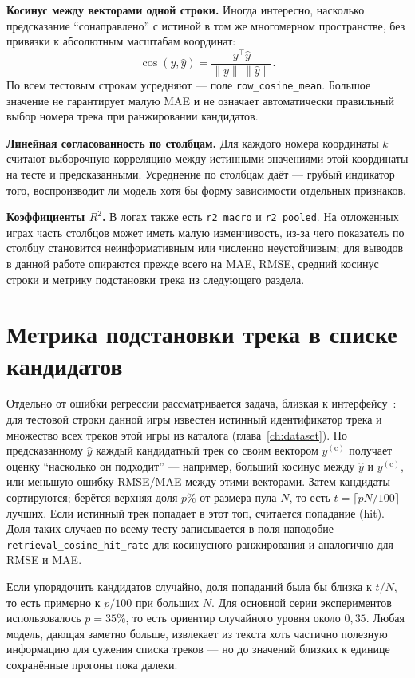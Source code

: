 \textbf{Косинус между векторами одной строки.} Иногда интересно, насколько предсказание ``сонаправлено'' с истиной в том же многомерном пространстве, без привязки к абсолютным масштабам координат:
\[
\cos(y, \hat y) = \frac{y^\top \hat y}{\|y\|\,\|\hat y\|}.
\]
По всем тестовым строкам усредняют --- поле \texttt{row\_cosine\_mean}. Большое значение не гарантирует малую MAE и не означает автоматически правильный выбор номера трека при ранжировании кандидатов.

\textbf{Линейная согласованность по столбцам.} Для каждого номера координаты $k$ считают выборочную корреляцию между истинными значениями этой координаты на тесте и предсказанными. Усреднение по столбцам даёт  --- грубый индикатор того, воспроизводит ли модель хотя бы форму зависимости отдельных признаков.

\textbf{Коэффициенты $R^2$.} В логах также есть \texttt{r2\_macro} и \texttt{r2\_pooled}. На отложенных играх часть столбцов может иметь малую изменчивость, из-за чего показатель по столбцу становится неинформативным или численно неустойчивым; для выводов в данной работе опираются прежде всего на MAE, RMSE, средний косинус строки и метрику подстановки трека из следующего раздела.

\section{Метрика подстановки трека в списке кандидатов}
\label{sec:hit-at-p}

Отдельно от ошибки регрессии рассматривается задача, близкая к интерфейсу~\cite{nikolenko2018}: для тестовой строки данной игры известен истинный идентификатор трека и множество всех треков этой игры из каталога (глава~\ref{ch:dataset}). По предсказанному $\hat y$ каждый кандидатный трек со своим вектором $y^{(\mathrm{c})}$ получает оценку ``насколько он подходит'' --- например, больший косинус между $\hat y$ и $y^{(\mathrm{c})}$, или меньшую ошибку RMSE/MAE между этими векторами. Затем кандидаты сортируются; берётся верхняя доля $p$\% от размера пула $N$, то есть $t = \lceil pN/100\rceil$ лучших. Если истинный трек попадает в этот топ, считается попадание (hit). Доля таких случаев по всему тесту записывается в поля наподобие \texttt{retrieval\_cosine\_hit\_rate} для косинусного ранжирования и аналогично для RMSE и MAE.

Если упорядочить кандидатов случайно, доля попаданий была бы близка к $t/N$, то есть примерно к $p/100$ при больших $N$. Для основной серии экспериментов использовалось $p = 35$\%, то есть ориентир случайного уровня около $0{,}35$. Любая модель, дающая заметно больше, извлекает из текста хоть частично полезную информацию для сужения списка треков --- но до значений близких к единице сохранённые прогоны пока далеки.

